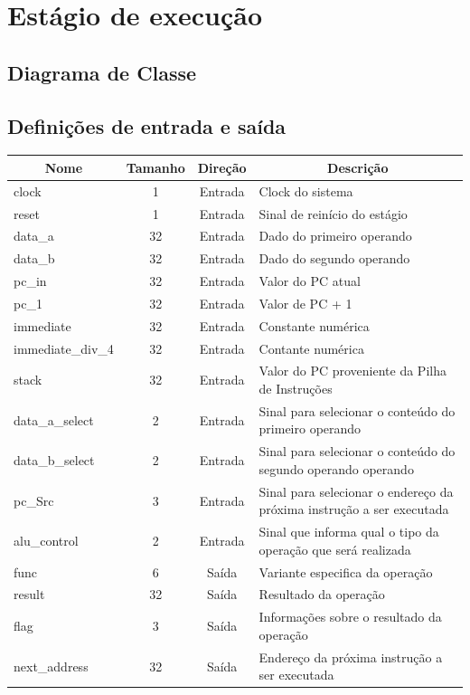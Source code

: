 \section{Estágio de execução}
	\subsection{Diagrama de Classe}
  \begin{figure}[h]
    
  \end{figure}
		
		\subsection{Definições de entrada e saída}
		
	\begin{center}
		\begin{longtable}[pos]{| l | c | c | m{7cm} |} \hline
			\multicolumn{1}{|c|}{\cellcolor[gray]{0.9}\textbf{Nome}} & 
			\multicolumn{1}{c|}{\cellcolor[gray]{0.9}\textbf{Tamanho}} & 
			\multicolumn{1}{c|}{\cellcolor[gray]{0.9}\textbf{Direção}} &
			\multicolumn{1}{c|}{\cellcolor[gray]{0.9}\textbf{Descrição}} \\ \hline
			\endhead
			\hline
			\endlastfoot

			clock & 1 & Entrada & Clock do sistema \\ \hline
			reset & 1 & Entrada & Sinal de reinício do estágio\\ \hline
			data\_a & 32 & Entrada & Dado do primeiro operando \\ \hline
			data\_b & 32 & Entrada & Dado do segundo operando \\ \hline
			pc\_in & 32 & Entrada & Valor do PC atual \\ \hline
			pc\_1 & 32 & Entrada & Valor de PC + 1\\ \hline
			immediate & 32 & Entrada & Constante numérica  \\ \hline
			immediate\_div\_4 & 32 & Entrada & Contante numérica \\\hline
			stack & 32 & Entrada & Valor do PC proveniente da Pilha de Instruções \\\hline
			data\_a\_select & 2 & Entrada & Sinal para selecionar o conteúdo do primeiro operando \\\hline
			data\_b\_select & 2 & Entrada & Sinal para selecionar o conteúdo do segundo operando operando \\\hline
			pc\_Src & 3 & Entrada & Sinal para selecionar o endereço da próxima instrução a ser executada \\\hline
			alu\_control & 2 & Entrada & Sinal que informa qual o tipo da operação que será realizada\\\hline
			func & 6 & Saída & Variante especifica da operação \\\hline
			result & 32 & Saída & Resultado da operação \\\hline
			flag & 3 & Saída & Informações sobre o resultado da operação \\\hline
			next\_address & 32 & Saída & Endereço da próxima instrução a ser executada\\\hline
			

\end{longtable}
\end{center}
